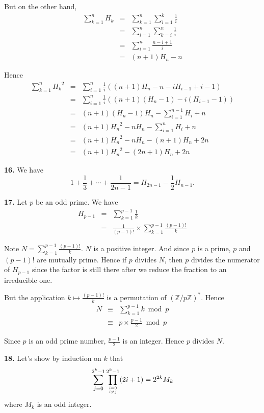 \documentclass[a4paper,12pt]{article}
\newcommand{\newpar}[1]{\bigskip \noindent \textbf{#1.}}
\begin{document}
But on the other hand,
\begin{eqnarray*}
  \sum_{k=1}^n H_k &=& \sum_{k=1}^n \sum_{i=1}^k \frac{1}{i} \\
  &=& \sum_{i=1}^n \sum_{k=i}^n \frac{1}{i} \\
  &=& \sum_{i=1}^n \frac{n-i+1}{i} \\
  &=& (n+1)H_n - n
\end{eqnarray*}

Hence
\begin{eqnarray*}
  \sum_{k=1}^n {H_k}^2 &=& \sum_{i=1}^n \frac{1}{i} \left( (n+1)H_n -
  n - i H_{i-1} + i - 1\right) \\
  &=& \sum_{i=1}^n \frac{1}{i} \left((n+1)(H_n - 1) -
  i(H_{i-1}-1)\right) \\
  &=& (n+1)(H_n - 1)H_n - \sum_{i=1}^{n-1} H_i + n \\
  &=& (n+1){H_n}^2 - nH_n - \sum_{i=1}^n H_i + n \\
  &=& (n+1){H_n}^2 - nH_n - (n+1)H_n + 2n \\
  &=& (n+1){H_n}^2 - (2n+1)H_n + 2n
\end{eqnarray*}

\newpar{16} We have
\[  1 + \frac{1}{3} + \cdots + \frac{1}{2n-1} = H_{2n-1} - \frac{1}{2}
H_{n-1} .\]

\newpar{17}  Let $p$ be an odd prime.  We have
\begin{eqnarray*}
  H_{p-1} &=& \sum_{k=1}^{p-1} \frac{1}{k} \\
  &=& \frac{1}{(p-1)!} \times \sum_{k=1}^{p-1} \frac{(p-1)!}{k}
\end{eqnarray*}

Note $N = \sum_{k=1}^{p-1}\frac{(p-1)!}{k}$.  $N$ is a positive
integer.  And since $p$ is a prime, $p$ and $(p-1)!$ are mutually
prime.  Hence if $p$ divides $N$, then $p$ divides the numerator  of
$H_{p-1}$ since the factor is still there after we reduce the fraction
to an irreducible one.

But the application $k \mapsto \frac{(p-1)!}{k}$ is a permutation of
$(\mathbb{Z}/p\mathbb{Z})^*$.  Hence
\begin{eqnarray*}
  N &\equiv& \sum_{k=1}^{p-1} k \bmod p \\
  &\equiv& p\times\frac{p-1}{2} \bmod p
\end{eqnarray*}

Since $p$ is an odd prime number, $\frac{p-1}{2}$ is an integer.
Hence $p$ divides $N$.

\newpar{18} Let's show by induction on $k$ that
\[ \sum_{j = 0}^{2^k-1} \prod_{i=0 \atop i \not= j}^{2^k-1} (2i+1) =
2^{2k}M_k \]
where $M_k$ is an odd integer.
\end{document}
